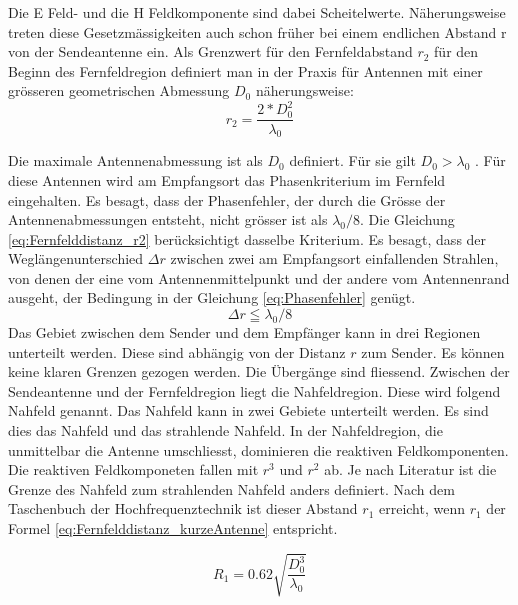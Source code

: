 Die E Feld- und die H Feldkomponente sind dabei Scheitelwerte.
Näherungsweise treten diese Gesetzmässigkeiten auch schon früher bei einem endlichen Abstand r von der Sendeantenne ein. Als Grenzwert für den Fernfeldabstand $r_{2}$ für den Beginn des Fernfeldregion  definiert man in der Praxis für Antennen mit einer grösseren geometrischen Abmessung $D_{0}$ näherungsweise\cite{meinke1992taschenbuch}:
\begin{equation}
r_{2}=\dfrac{2*D_{0}^{2}}{\lambda_{0}} \label{eq:Fernfelddistanz_r2}
\end{equation}

Die maximale Antennenabmessung ist als $D_{0}$ definiert. Für sie gilt $D_{0}>\lambda_{0}$ . Für diese Antennen wird am Empfangsort das Phasenkriterium im Fernfeld eingehalten. Es besagt, dass der Phasenfehler, der durch die Grösse der Antennenabmessungen entsteht, nicht grösser ist als $\lambda_{0}/8$.  Die Gleichung \ref{eq:Fernfelddistanz_r2} berücksichtigt dasselbe Kriterium. Es besagt, dass der Weglängenunterschied $\Delta r$ zwischen zwei am Empfangsort einfallenden Strahlen, von denen der eine vom Antennenmittelpunkt und der andere vom Antennenrand ausgeht, der Bedingung in der Gleichung \ref{eq:Phasenfehler} genügt\cite{meinke1992taschenbuch}.
\begin{equation}
\Delta r\leqq\lambda_{0}/8 \label{eq:Phasenfehler}
\end{equation}
Das Gebiet zwischen dem Sender und dem Empfänger kann in drei Regionen unterteilt werden. Diese sind abhängig von der Distanz $r$ zum Sender. Es können keine klaren Grenzen gezogen werden. Die Übergänge sind fliessend. Zwischen der Sendeantenne und der Fernfeldregion liegt die Nahfeldregion. Diese wird folgend Nahfeld genannt. Das Nahfeld kann in zwei Gebiete unterteilt werden. Es sind dies das Nahfeld und das strahlende Nahfeld. In der  Nahfeldregion, die unmittelbar die Antenne umschliesst, dominieren die reaktiven Feldkomponenten. Die reaktiven Feldkomponeten fallen  mit $r^{3}$ und $r^{2}$ ab.  Je nach Literatur ist die Grenze des Nahfeld zum strahlenden Nahfeld anders definiert. Nach dem Taschenbuch der Hochfrequenztechnik ist dieser Abstand $r_{1}$ erreicht, wenn $r_{1}$ der Formel \ref{eq:Fernfelddistanz_kurzeAntenne} entspricht\cite{meinke1992taschenbuch}.

\begin{equation}
R_{1}=0.62\sqrt{\dfrac{D_{0}^{3}}{\lambda_{0}}} \label{eq:Fernfelddistanz_kurzeAntenne}
\end{equation}

